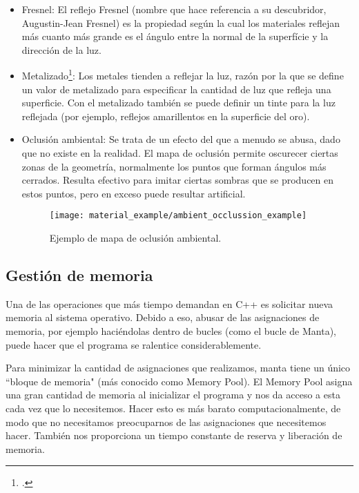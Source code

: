 \begin{itemize}
    \item Fresnel: El reflejo Fresnel (nombre que hace referencia a su descubridor, Augustin-Jean Fresnel) es la propiedad según la cual los materiales reflejan más cuanto más grande es el ángulo entre la normal de la superfície y la dirección de la luz.
    \item Metalizado\footcite{marmoset_basicpbr}: Los metales tienden a reflejar la luz, razón por la que se define un valor de metalizado para especificar la cantidad de luz que refleja una superficie. Con el metalizado también se puede definir un tinte para la luz reflejada (por ejemplo, reflejos amarillentos en la superficie del oro).
    \item Oclusión ambiental: Se trata de un efecto del que a menudo se abusa, dado que no existe en la realidad. El mapa de oclusión permite oscurecer ciertas zonas de la geometría, normalmente los puntos que forman ángulos más cerrados. Resulta efectivo para imitar ciertas sombras que se producen en estos puntos, pero en exceso puede resultar artificial.
    \begin{figure}[H]
        \centering
        \texttt{[image: material\_example/ambient\_occlussion\_example]}
        \caption{Ejemplo de mapa de oclusión ambiental.}
        \label{fig:occlusion_ex}
    \end{figure}
\end{itemize}

\subsection{Gestión de memoria}
\label{engine_memory}
Una de las operaciones que más tiempo demandan en C++ es solicitar nueva memoria al sistema operativo. Debido a eso, abusar de las asignaciones de memoria, por ejemplo haciéndolas dentro de bucles (como el bucle de Manta), puede hacer que el programa se ralentice considerablemente.

Para minimizar la cantidad de asignaciones que realizamos, manta tiene un único ``bloque de memoria" (más conocido como Memory Pool). El Memory Pool asigna una gran cantidad de memoria al inicializar el programa y nos da acceso a esta cada vez que lo necesitemos. Hacer esto es más barato computacionalmente, de modo que no necesitamos preocuparnos de las asignaciones que necesitemos hacer. También nos proporciona un tiempo constante de reserva y liberación de memoria.

